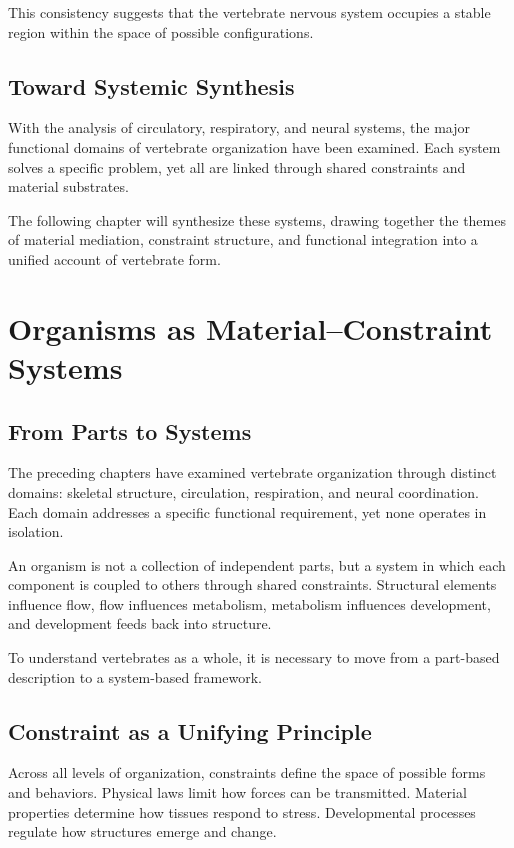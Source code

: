 \documentclass[11pt,oneside]{book}
\begin{document}
This consistency suggests that the vertebrate nervous system occupies a stable region within the space of possible configurations.

\section{Toward Systemic Synthesis}

With the analysis of circulatory, respiratory, and neural systems, the major functional domains of vertebrate organization have been examined. Each system solves a specific problem, yet all are linked through shared constraints and material substrates.

The following chapter will synthesize these systems, drawing together the themes of material mediation, constraint structure, and functional integration into a unified account of vertebrate form.

\chapter{Organisms as Material--Constraint Systems}

\section{From Parts to Systems}

The preceding chapters have examined vertebrate organization through distinct domains: skeletal structure, circulation, respiration, and neural coordination. Each domain addresses a specific functional requirement, yet none operates in isolation.

An organism is not a collection of independent parts, but a system in which each component is coupled to others through shared constraints. Structural elements influence flow, flow influences metabolism, metabolism influences development, and development feeds back into structure.

To understand vertebrates as a whole, it is necessary to move from a part-based description to a system-based framework.

\section{Constraint as a Unifying Principle}

Across all levels of organization, constraints define the space of possible forms and behaviors. Physical laws limit how forces can be transmitted. Material properties determine how tissues respond to stress. Developmental processes regulate how structures emerge and change.
\end{document}
